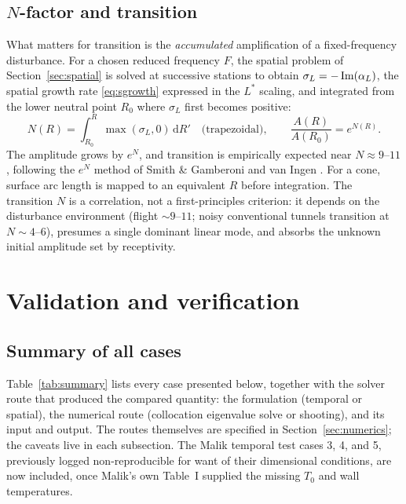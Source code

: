 \documentclass[11pt]{article}
\begin{document}
\subsection{$N$-factor and transition}\label{sec:nfactor}
What matters for transition is the \emph{accumulated} amplification of a fixed-frequency disturbance.
For a chosen reduced frequency $F$, the spatial problem of Section~\ref{sec:spatial} is solved at
successive stations to obtain $\sigma_L=-\operatorname{Im}(\alpha_L)$, the spatial growth rate
\eqref{eq:sgrowth} expressed in the $L^*$ scaling, and integrated from the lower neutral point
$R_0$ where $\sigma_L$ first becomes positive:
\begin{equation}\label{eq:N}
  N(R)=\int_{R_0}^R\max(\sigma_L,0)\,\mathrm dR'\quad\text{(trapezoidal)},\qquad
  \frac{A(R)}{A(R_0)}=e^{N(R)} .
\end{equation}
The amplitude grows by $e^N$, and transition is empirically expected near $N\approx9$--$11$,
following the $e^N$ method of Smith \& Gamberoni and van Ingen \cite{smith1956,vaningen1956}.
For a cone, surface arc length is mapped to an equivalent $R$ before
integration. The transition $N$ is a correlation, not a first-principles criterion: it depends on the
disturbance environment (flight ${\sim}9$--$11$; noisy conventional tunnels transition at
$N\sim4$--$6$), presumes a single dominant linear mode, and absorbs the unknown initial amplitude
set by receptivity.


\clearpage
\section{Validation and verification}\label{sec:validation}
\subsection{Summary of all cases}
\label{sec:summary-table}

Table~\ref{tab:summary} lists every case presented below, together with the solver route that
produced the compared quantity: the formulation (temporal or spatial), the numerical route
(collocation eigenvalue solve or shooting), and its input and output. The routes themselves are
specified in Section~\ref{sec:numerics}; the caveats live in each subsection. The
Malik temporal test cases 3, 4, and 5, previously logged non-reproducible for want of their
dimensional conditions, are now included, once Malik's own Table~I supplied the missing $T_0$ and
wall temperatures.
\end{document}

